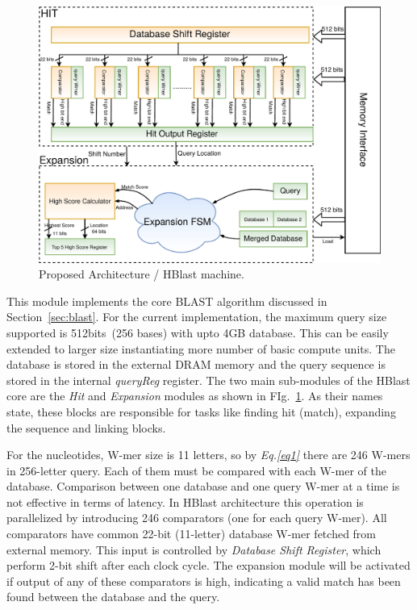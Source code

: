 \begin{figure}[t!]
\centering
\includegraphics[width=\columnwidth]{Figures/BlastMachine.pdf}
\caption{Proposed Architecture / HBlast machine.} \label{fig:blastArch}
\end{figure}

This module implements the core BLAST algorithm discussed in Section~\ref{sec:blast}.
For the current implementation, the maximum query size supported is 512bits~(256 bases) with upto 4GB database. 
This can be easily extended to larger size instantiating more number of basic compute units.
The database is stored in the external DRAM memory and the query sequence is stored in the internal \textit{queryReg} register.
The two main sub-modules of the HBlast core are the \textit{Hit} and \textit{Expansion} modules as shown in FIg.~\ref{fig:blastArch}. As their names state, these blocks are responsible for tasks like finding hit (match), expanding the sequence and linking blocks. 

For the nucleotides, W-mer size is 11 letters, so by \textit{Eq.\ref{eq1}} there are 246 W-mers in 256-letter query. 
Each of them must be compared with each W-mer of the database.  
Comparison between one database and one query W-mer at a time is not effective in terms of latency. 
In HBlast architecture this operation is parallelized by introducing 246 comparators (one for each query W-mer). 
All comparators have common 22-bit (11-letter) database W-mer fetched from external memory. 
This input is controlled by \textit{Database Shift Register}, which perform 2-bit shift after each clock cycle. 
The expansion module will be activated if output of any of these comparators is high, indicating a valid match has been found between the database and the query. 


